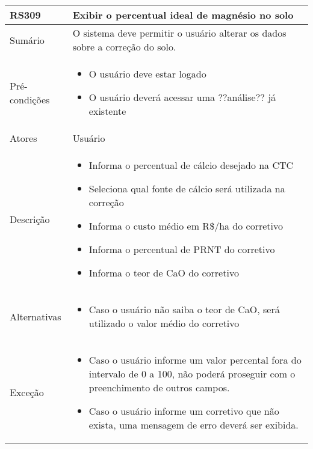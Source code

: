 \begin{quadro}[H]
    \begin{tabular}{|p{3cm}|p{11cm}|}
        \hline
        \textbf{RS309} & \textbf{Exibir o percentual ideal de magnésio no solo}                       \\
        \hline
        Sumário        & O sistema deve permitir o usuário alterar os dados sobre a correção do solo. \\
        \hline
        Pré-condições  & \begin{itemize}
            \item O usuário deve estar logado
            \item O usuário deverá acessar uma ??análise?? já existente
        \end{itemize}                                                   \\
        \hline
        Atores         & Usuário                                                                      \\
        \hline
        Descrição      &
        \begin{itemize}
            \item Informa o percentual de cálcio desejado na CTC
            \item Seleciona qual fonte de cálcio será utilizada na correção
            \item Informa o custo médio em R\$/ha do corretivo
            \item Informa o percentual de PRNT do corretivo
            \item Informa o teor de CaO do corretivo
        \end{itemize}                                                                    \\
        \hline
        Alternativas   &
        \begin{itemize}
            \item Caso o usuário não saiba o teor de CaO, será utilizado o valor médio do corretivo
        \end{itemize}                                                                    \\
        \hline
        Exceção        &
        \begin{itemize}
            \item Caso o usuário informe um valor percental fora do intervalo de 0 a 100, não poderá proseguir com o preenchimento de outros campos.
            \item Caso o usuário informe um corretivo que não exista, uma mensagem de erro deverá ser exibida.
        \end{itemize}                                                                    \\
        \hline
    \end{tabular}
\end{quadro}

